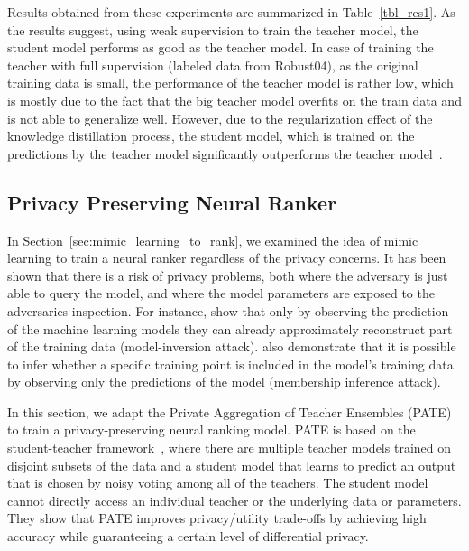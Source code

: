 Results obtained from these experiments are summarized in Table~\ref{tbl_res1}. As the results suggest, using weak supervision to train the teacher model, the student model performs as good as the teacher model. In case of training the teacher with full supervision (labeled data from Robust04), as the original training data is small, the performance of the teacher model is rather low, which is mostly due to the fact that the big teacher model overfits on the train data and is not able to generalize well. 
However, due to the regularization effect of the knowledge distillation process, the student model, which is trained on the predictions by the teacher model significantly outperforms the teacher model~\citep{Hinton:2015,Romero:2014}.

\subsection{Privacy Preserving Neural Ranker}
In Section~\ref{sec:mimic_learning_to_rank}, we examined the idea of mimic learning to train a neural ranker regardless of the privacy concerns.
It has been shown that there is a risk of privacy problems, both where the adversary is just able to query the model, and where the model parameters are exposed to the adversaries inspection.
For instance, \citet{Fredrikson:2015} show that only by observing the prediction of the machine learning models they can already approximately reconstruct part of the training data (model-inversion attack). \citet{Shokri:2016} also demonstrate that it is possible to infer whether a specific training point is included in the model's training data by observing only the predictions of the model (membership inference attack).

In this section, we adapt the Private Aggregation of Teacher Ensembles (PATE)~\citep{Papernot:2017} to train a privacy-preserving neural ranking model.  PATE is based on the student-teacher framework~\citep{Hinton:2015}, where there are multiple teacher models trained on disjoint subsets of the data and a student model that learns to predict an output that is chosen by noisy voting among all of the teachers. The student model cannot directly access an individual teacher or the underlying data or parameters. They show that PATE improves privacy/utility trade-offs by achieving high accuracy while guaranteeing a certain level of differential privacy.

